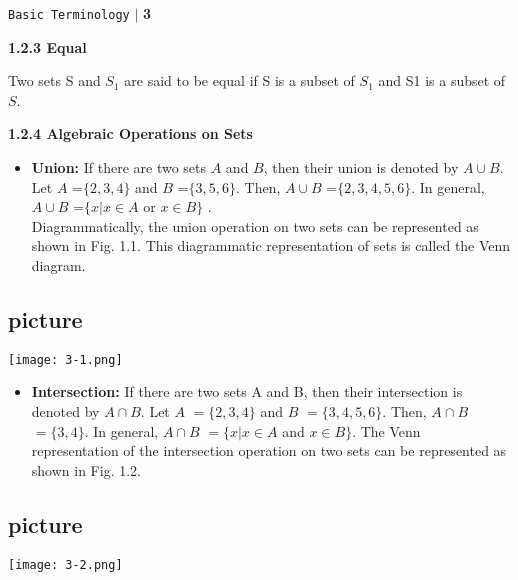 \documentclass[10pt]{article}
\begin{document}
\begin{flushright}
 \texttt{Basic Terminology} \hspace*{0.1cm}\textbf{$|$} \hspace*{0.1cm} \textbf{3}\hspace*{0.1cm}
\end{flushright}

\vspace*{1cm}
\large{\textbf{1.2.3 Equal}}

\vspace*{0.1cm}
Two sets S and $S_1$ are said to be equal if S is a subset of $S_1$ and S1 is a subset of $S$.

\large{\textbf{1.2.4 Algebraic Operations on Sets}}

\begin{itemize}
  \item \textbf{Union:} If there are two sets $A$ and $B$, then their union is denoted by $A \cup B$.\\
  Let $A$ =$ \{2, 3, 4\}$ and $B$ =$ \{3, 5, 6\}$. Then, $A \cup B$ =$ \{2, 3, 4, 5, 6\}$. In general, $A \cup B$ =$ \{x | x \in A$ or $x \in B\}$ .\\
 \hspace*{0.2cm} Diagrammatically, the union operation on two sets can be represented as shown in Fig. 1.1. This diagrammatic representation of sets is called the Venn diagram.
\end{itemize}


\begin{center}
\section{picture}
\texttt{[image: 3-1.png]}
\end{center}

\begin{itemize}
  \item \textbf{Intersection:} If there are two sets A and B, then their intersection is
denoted by $A \cap B$. Let $A$ $= \{2, 3, 4\}$ and $B$ $= \{3, 4, 5, 6\}$. Then, $A \cap B$ $=
\{3, 4\}$. In general, $A \cap B$ $= \{x | x \in A$ and $x \in B\}$.
The Venn representation of the intersection operation on two sets can be represented as shown in Fig. 1.2.
\end{itemize}
\begin{center}
\section{picture}
\texttt{[image: 3-2.png]}
\end{center}
\end{document}
